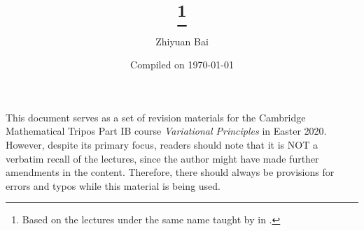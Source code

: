 \documentclass[a4paper]{article}
\title{\triposcourse{}
\thanks{Based on the lectures under the same name taught by \triposlecturer{} in \triposterm{}.}}
\author{Zhiyuan Bai}
\date{Compiled on \today}
\newcommand{\triposcourse}{Variational Principles}
\newcommand{\triposterm}{Easter 2020}
\newcommand{\tripospart}{IB}
\theoremstyle{plain}
\theoremstyle{definition}
\theoremstyle{remark}
\begin{document}
    \maketitle
    This document serves as a set of revision materials for the Cambridge Mathematical Tripos Part \tripospart{} course \textit{\triposcourse{}} in \triposterm{}.
    However, despite its primary focus, readers should note that it is NOT a verbatim recall of the lectures, since the author might have made further amendments in the content.
    Therefore, there should always be provisions for errors and typos while this material is being used.
    \tableofcontents
    
    
    
    
    
    
    
    
\end{document}
